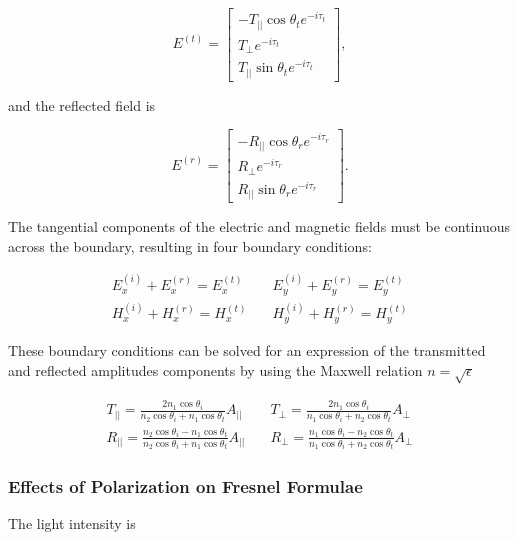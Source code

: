 \begin{equation}
    E^{(t)} = 
    \begin{bmatrix}
        -T_{||} \cos{\theta_t} e^{-i \tau_t} \\
        T_\perp e^{-i \tau_t} \\
        T_{||} \sin{\theta_t} e^{-i \tau_t}
    \end{bmatrix},
\end{equation}

and the reflected field is

\begin{equation}
    E^{(r)} = 
    \begin{bmatrix}
        -R_{||} \cos{\theta_r} e^{-i \tau_r} \\
        R_\perp e^{-i \tau_r} \\
        R_{||} \sin{\theta_r} e^{-i \tau_r}
    \end{bmatrix}.
\end{equation}

The tangential components of the electric and magnetic fields must be continuous across the boundary, resulting in four boundary conditions:

\begin{align}
    E^{(i)}_x + E^{(r)}_x = E^{(t)}_x \quad & E^{(i)}_y + E^{(r)}_y = E^{(t)}_y \\
    H^{(i)}_x + H^{(r)}_x = H^{(t)}_x \quad & H^{(i)}_y + H^{(r)}_y = H^{(t)}_y
\end{align}

These boundary conditions can be solved for an expression of the transmitted and reflected amplitudes components by using the Maxwell relation $n = \sqrt{\epsilon}$

\begin{align}
    T_{||} = \frac{2 n_1 \cos{\theta_i}}{n_2 \cos{\theta_i} + n_1 \cos{\theta_t}} A_{||} \quad &
    T_{\perp} = \frac{2 n_1 \cos{\theta_i}}{n_1 \cos{\theta_i} + n_2 \cos{\theta_t}} A_{\perp} \\
    R_{||} = \frac{n_2 \cos{\theta_i} - n_1 \cos{\theta_t}}{n_2 \cos{\theta_i} + n_1 \cos{\theta_t}} A_{||} \quad &
    R_{\perp} = \frac{n_1 \cos{\theta_i} - n_2 \cos{\theta_t}}{n_1 \cos{\theta_i} + n_2 \cos{\theta_t}} A_{\perp}
\end{align}

\subsubsection{Effects of Polarization on Fresnel Formulae}
The light intensity is

